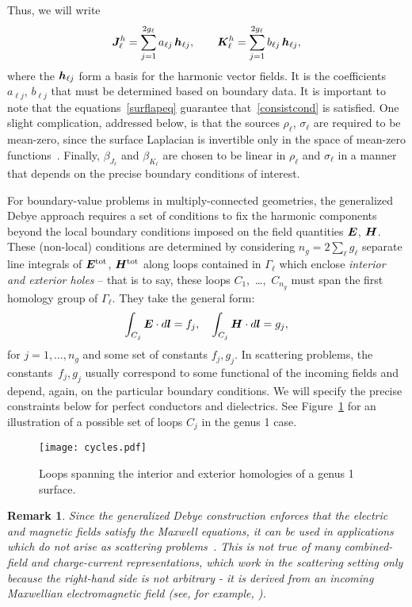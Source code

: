 \documentclass[11pt]{article}
\newcommand{\vct}{\vectorsym}
\newcommand{\bE}{\vectorsym{E}}
\newcommand{\bH}{\vct{ H}}
\newcommand{\bJ}{\vct{ J}}
\newcommand{\bK}{\vct{ K}}
\newtheorem{remark}{\sffamily Remark}
\newcommand\bl{\vct{ l}}
\newcommand\bh{\vct{h}}
\newcommand\bEtot{\vct{E}^\textnormal{tot}}
\newcommand\bHtot{\vct{H}^\textnormal{tot}}
\numberwithin{equation}{section}
\begin{document}
Thus, we will write
\begin{equation}
  \bJ^h_\ell = \sum_{j = 1}^{2g_\ell} a_{\ell j} \, \bh_{\ell j}, \qquad 
  \bK^h_\ell = \sum_{j = 1}^{2g_\ell} b_{\ell j} \, \bh_{\ell j},
\end{equation}
where the $\bh_{\ell j}$ form a basis for the harmonic vector fields.
It is the coefficients $a_{\ell j}$, $b_{\ell j}$ that must be determined
based on boundary data.
It is important to note that the equations~\eqref{surflapeq}
guarantee that~\eqref{consistcond} is satisfied.
One slight complication, addressed below, is that the
sources $\rho_\ell$, $\sigma_\ell$ are required to be
mean-zero, since the surface Laplacian is invertible only in the space
of mean-zero functions~\cite{EpGr}.
Finally, $\beta_{J_\ell}$ and $\beta_{K_\ell}$ are chosen to be 
linear in $\rho_\ell$ and $\sigma_\ell$ in a manner that depends on the precise
boundary conditions of interest. 

For boundary-value problems in multiply-connected geometries, the generalized
Debye approach requires a set of conditions to fix the harmonic components
beyond the local boundary conditions imposed on the field quantities
$\bE$, $\bH$.
These (non-local) conditions are determined by considering $n_g = 2\sum_\ell
g_\ell$ separate
line integrals of $\bEtot$, $\bHtot$ along loops contained in $\Gamma_\ell$ 
which enclose \emph{interior and exterior holes} -- that is to say,
these loops \mbox{$C_1$, \ldots, $C_{n_g}$} must span the first
homology group of $\Gamma_\ell.$ 
They take the general form:
\begin{equation}
\int_{C_j} \bE \cdot d\bl = f_j,\quad
\int_{C_j} \bH \cdot d\bl = g_j,
\end{equation}
for $j = 1, \ldots, n_g$ and some set of constants $f_j,g_j$. In scattering
problems, the
constants~$f_j, g_j$ usually correspond to some functional of the
incoming fields and depend, again, on the particular boundary conditions.
We will specify the precise constraints below for perfect conductors and 
dielectrics.
See Figure~\ref{fig_cycles} for an illustration of a possible set of 
loops $C_j$ in the genus 1 case.

\begin{figure}[t]
  \centering
  \texttt{[image: cycles.pdf]}
  \caption{Loops spanning the interior and exterior homologies of a
      genus 1 surface.}
  \label{fig_cycles}
\end{figure}

\begin{remark}
Since the generalized Debye construction enforces that 
the electric and magnetic fields satisfy the Maxwell equations, it
can be used in applications which do not arise as
\emph{scattering problems}~\cite{EpGrOn2}. This is not true of
many combined-field and charge-current representations, which work
in the scattering setting only because the right-hand side is
not arbitrary - it is derived from an incoming Maxwellian electromagnetic field
(see, for example, \cite{vico-2013}).
\end{remark}
\end{document}
